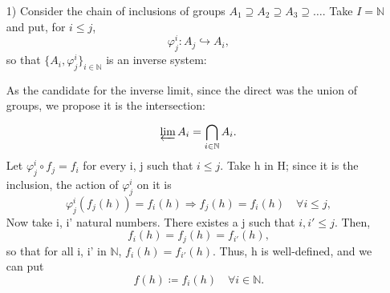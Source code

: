 \documentclass[../category_theory.tex]{subfiles}
\begin{document}
\begin{example}
	\begin{itemize}
		\item[1)] Consider the chain of inclusions of groups \(A_1\supseteq A_2\supseteq A_3\supseteq \dotsc \). Take \(I=\mathbb{N}\) and put, for \(i\leq j\),
		      \[
			      \varphi_{j}^{i}:A_{j}\hookrightarrow A_{i},
		      \]
		      so that \(\{A_{i}, \varphi_{j}^{i}\}_{i\in \mathbb{N}}\) is an inverse system:
		      \begin{center}
		      \end{center}

		      As the candidate for the inverse limit, since the direct was the union of groups, we propose it is the intersection:
		      \[
			      \varprojlim_{}A_{i}=\bigcap_{i\in \mathbb{N}}^{} A_{i}.
		      \]
		      Let \(\varphi_{j}^{i}\circ f_{j}=f_{i}\) for every i, j such that \(i\leq j\). Take h in H; since it is the inclusion, the action of \(\varphi_{j}^{i}\) on it is
		      \[
			      \varphi_{j}^{i}(f_{j}(h))=f_{i}(h)\Rightarrow f_{j}(h)=f_{i}(h)\quad \forall i\leq j,
		      \]
		      Now take i, i' natural numbers. There existes a j such that \(i, i'\leq j\). Then,
		      \[
			      f_{i}(h)=f_{j}(h)=f_{i'}(h),
		      \]
		      so that for all i, i' in \(\mathbb{N}\), \(f_{i}(h)=f_{i'}(h).\) Thus, h is well-defined, and we can put
		      \[
			      f(h)\coloneqq f_{i}(h)\quad \forall i\in \mathbb{N}.
		      \]


\end{itemize}
\end{example}
\end{document}
